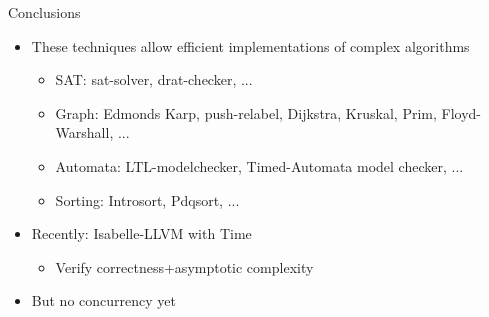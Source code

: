 \documentclass[fleqn]{beamer}
\newcommand{\high}[1]{{\color{blue}#1}}
\begin{document}
\begin{frame}{Conclusions}
  \begin{itemize}
   \item These techniques allow efficient implementations of complex algorithms
    \begin{itemize}
     \item SAT: sat-solver, drat-checker, ...
     \item Graph: Edmonds Karp, push-relabel, Dijkstra, Kruskal, Prim, Floyd-Warshall, ...
     \item Automata: LTL-modelchecker, Timed-Automata model checker, ...
     \item Sorting: Introsort, Pdqsort, ...
    \end{itemize}
   \item Recently: Isabelle-LLVM with Time
    \begin{itemize}
     \item Verify correctness+asymptotic complexity
    \end{itemize}
   \item \high{But} no concurrency yet


\end{itemize}
\end{frame}
\end{document}

